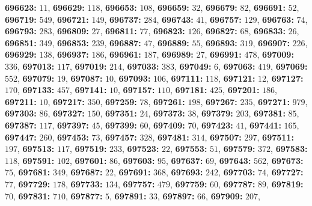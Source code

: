\textsf{\bfseries 696623:} $11$, \textsf{\bfseries 696629:} $118$, \textsf{\bfseries 696653:} $108$, \textsf{\bfseries 696659:} $32$, \textsf{\bfseries 696679:} $82$, \textsf{\bfseries 696691:} $52$, \textsf{\bfseries 696719:} $549$, \textsf{\bfseries 696721:} $149$, \textsf{\bfseries 696737:} $284$, \textsf{\bfseries 696743:} $41$, \textsf{\bfseries 696757:} $129$, \textsf{\bfseries 696763:} $74$, \textsf{\bfseries 696793:} $283$, \textsf{\bfseries 696809:} $27$, \textsf{\bfseries 696811:} $77$, \textsf{\bfseries 696823:} $126$, \textsf{\bfseries 696827:} $68$, \textsf{\bfseries 696833:} $26$, \textsf{\bfseries 696851:} $349$, \textsf{\bfseries 696853:} $239$, \textsf{\bfseries 696887:} $47$, \textsf{\bfseries 696889:} $55$, \textsf{\bfseries 696893:} $319$, \textsf{\bfseries 696907:} $226$, \textsf{\bfseries 696929:} $138$, \textsf{\bfseries 696937:} $186$, \textsf{\bfseries 696961:} $187$, \textsf{\bfseries 696989:} $27$, \textsf{\bfseries 696991:} $478$, \textsf{\bfseries 697009:} $336$, \textsf{\bfseries 697013:} $117$, \textsf{\bfseries 697019:} $214$, \textsf{\bfseries 697033:} $383$, \textsf{\bfseries 697049:} $6$, \textsf{\bfseries 697063:} $419$, \textsf{\bfseries 697069:} $552$, \textsf{\bfseries 697079:} $19$, \textsf{\bfseries 697087:} $10$, \textsf{\bfseries 697093:} $106$, \textsf{\bfseries 697111:} $118$, \textsf{\bfseries 697121:} $12$, \textsf{\bfseries 697127:} $170$, \textsf{\bfseries 697133:} $457$, \textsf{\bfseries 697141:} $10$, \textsf{\bfseries 697157:} $110$, \textsf{\bfseries 697181:} $425$, \textsf{\bfseries 697201:} $186$, \textsf{\bfseries 697211:} $10$, \textsf{\bfseries 697217:} $350$, \textsf{\bfseries 697259:} $78$, \textsf{\bfseries 697261:} $198$, \textsf{\bfseries 697267:} $235$, \textsf{\bfseries 697271:} $979$, \textsf{\bfseries 697303:} $86$, \textsf{\bfseries 697327:} $150$, \textsf{\bfseries 697351:} $24$, \textsf{\bfseries 697373:} $38$, \textsf{\bfseries 697379:} $203$, \textsf{\bfseries 697381:} $85$, \textsf{\bfseries 697387:} $117$, \textsf{\bfseries 697397:} $45$, \textsf{\bfseries 697399:} $60$, \textsf{\bfseries 697409:} $70$, \textsf{\bfseries 697423:} $41$, \textsf{\bfseries 697441:} $165$, \textsf{\bfseries 697447:} $260$, \textsf{\bfseries 697453:} $73$, \textsf{\bfseries 697457:} $328$, \textsf{\bfseries 697481:} $314$, \textsf{\bfseries 697507:} $297$, \textsf{\bfseries 697511:} $197$, \textsf{\bfseries 697513:} $117$, \textsf{\bfseries 697519:} $233$, \textsf{\bfseries 697523:} $22$, \textsf{\bfseries 697553:} $51$, \textsf{\bfseries 697579:} $372$, \textsf{\bfseries 697583:} $118$, \textsf{\bfseries 697591:} $102$, \textsf{\bfseries 697601:} $86$, \textsf{\bfseries 697603:} $95$, \textsf{\bfseries 697637:} $69$, \textsf{\bfseries 697643:} $562$, \textsf{\bfseries 697673:} $75$, \textsf{\bfseries 697681:} $349$, \textsf{\bfseries 697687:} $22$, \textsf{\bfseries 697691:} $368$, \textsf{\bfseries 697693:} $242$, \textsf{\bfseries 697703:} $74$, \textsf{\bfseries 697727:} $77$, \textsf{\bfseries 697729:} $178$, \textsf{\bfseries 697733:} $134$, \textsf{\bfseries 697757:} $479$, \textsf{\bfseries 697759:} $60$, \textsf{\bfseries 697787:} $89$, \textsf{\bfseries 697819:} $70$, \textsf{\bfseries 697831:} $710$, \textsf{\bfseries 697877:} $5$, \textsf{\bfseries 697891:} $33$, \textsf{\bfseries 697897:} $66$, \textsf{\bfseries 697909:} $207$, 
